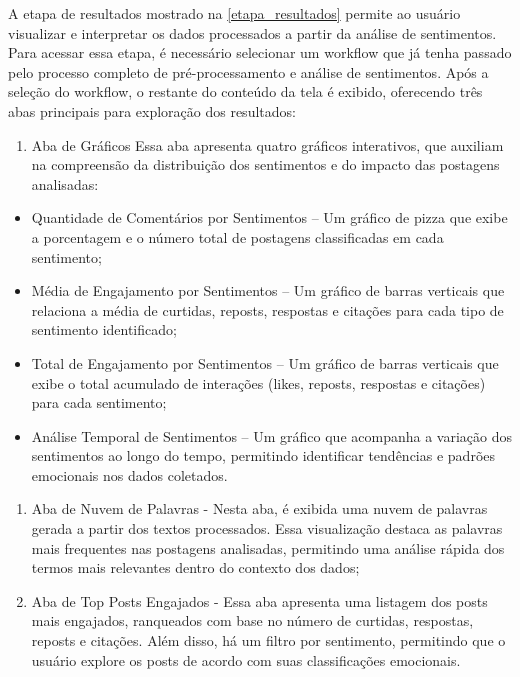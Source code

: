 \documentclass[
	12pt,				%
	oneside,			%
	a4paper,			%
	english,			%
	french,				%
	spanish,			%
	brazil				%
	]{abntex2}
\begin{document}
A etapa de resultados mostrado na \autoref{etapa_resultados} permite ao
usuário visualizar e interpretar os dados processados a partir da
análise de sentimentos. Para acessar essa etapa, é necessário selecionar
um workflow que já tenha passado pelo processo completo de
pré-processamento e análise de sentimentos. Após a seleção do workflow,
o restante do conteúdo da tela é exibido, oferecendo três abas
principais para exploração dos resultados:

\begin{enumerate}
\def\labelenumi{\arabic{enumi})}
\tightlist
\item
  Aba de Gráficos Essa aba apresenta quatro gráficos interativos, que
  auxiliam na compreensão da distribuição dos sentimentos e do impacto
  das postagens analisadas:
\end{enumerate}

\begin{itemize}
\tightlist
\item
  Quantidade de Comentários por Sentimentos -- Um gráfico de pizza que
  exibe a porcentagem e o número total de postagens classificadas em
  cada sentimento;
\item
  Média de Engajamento por Sentimentos -- Um gráfico de barras verticais
  que relaciona a média de curtidas, reposts, respostas e citações para
  cada tipo de sentimento identificado;
\item
  Total de Engajamento por Sentimentos -- Um gráfico de barras verticais
  que exibe o total acumulado de interações (likes, reposts, respostas e
  citações) para cada sentimento;
\item
  Análise Temporal de Sentimentos -- Um gráfico que acompanha a variação
  dos sentimentos ao longo do tempo, permitindo identificar tendências e
  padrões emocionais nos dados coletados.
\end{itemize}

\begin{enumerate}
\def\labelenumi{\arabic{enumi})}
\item
  Aba de Nuvem de Palavras - Nesta aba, é exibida uma nuvem de palavras
  gerada a partir dos textos processados. Essa visualização destaca as
  palavras mais frequentes nas postagens analisadas, permitindo uma
  análise rápida dos termos mais relevantes dentro do contexto dos
  dados;
\item
  Aba de Top Posts Engajados - Essa aba apresenta uma listagem dos posts
  mais engajados, ranqueados com base no número de curtidas, respostas,
  reposts e citações. Além disso, há um filtro por sentimento,
  permitindo que o usuário explore os posts de acordo com suas
  classificações emocionais.
\end{enumerate}
\end{document}
